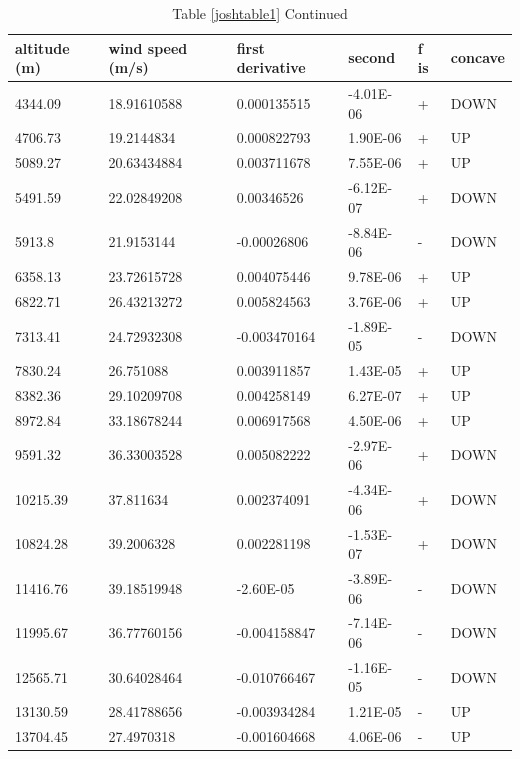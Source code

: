 \documentclass{article}
\begin{document}
\begin{table}
\centering
\caption{Table \ref{joshtable1} Continued}
\label{joshtable2}
\begin{tabular}{@{}llllll@{}}
\toprule
altitude (m) & wind speed (m/s) & first derivative & second    & f is & concave \\ \midrule
4344.09      & 18.91610588      & 0.000135515      & -4.01E-06 & +    & DOWN    \\
4706.73      & 19.2144834       & 0.000822793      & 1.90E-06  & +    & UP      \\
5089.27      & 20.63434884      & 0.003711678      & 7.55E-06  & +    & UP      \\
5491.59      & 22.02849208      & 0.00346526       & -6.12E-07 & +    & DOWN    \\
5913.8       & 21.9153144       & -0.00026806      & -8.84E-06 & -    & DOWN    \\
6358.13      & 23.72615728      & 0.004075446      & 9.78E-06  & +    & UP      \\
6822.71      & 26.43213272      & 0.005824563      & 3.76E-06  & +    & UP      \\
7313.41      & 24.72932308      & -0.003470164     & -1.89E-05 & -    & DOWN    \\
7830.24      & 26.751088        & 0.003911857      & 1.43E-05  & +    & UP      \\
8382.36      & 29.10209708      & 0.004258149      & 6.27E-07  & +    & UP      \\
8972.84      & 33.18678244      & 0.006917568      & 4.50E-06  & +    & UP      \\
9591.32      & 36.33003528      & 0.005082222      & -2.97E-06 & +    & DOWN    \\
10215.39     & 37.811634        & 0.002374091      & -4.34E-06 & +    & DOWN    \\
10824.28     & 39.2006328       & 0.002281198      & -1.53E-07 & +    & DOWN    \\
11416.76     & 39.18519948      & -2.60E-05        & -3.89E-06 & -    & DOWN    \\
11995.67     & 36.77760156      & -0.004158847     & -7.14E-06 & -    & DOWN    \\
12565.71     & 30.64028464      & -0.010766467     & -1.16E-05 & -    & DOWN    \\
13130.59     & 28.41788656      & -0.003934284     & 1.21E-05  & -    & UP      \\
13704.45     & 27.4970318       & -0.001604668     & 4.06E-06  & -    & UP      \\

\end{tabular}
\end{table}
\end{document}
